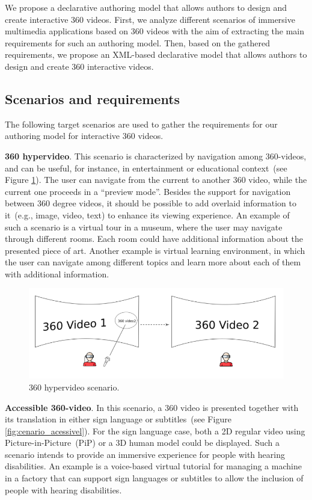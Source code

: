 We propose a declarative authoring model that allows authors to design and create interactive 360 videos.
First, we analyze different scenarios of immersive multimedia applications
based on 360 videos with the aim of extracting the main requirements for such
an authoring model.
Then, based on the gathered requirements, we propose an XML-based declarative
model that allows authors to design and create 360 interactive videos.

\subsection{Scenarios and requirements}
\label{subsec:authoring_scenarios}

The following target scenarios are used to gather the requirements for our
authoring model for interactive 360 videos.

\textbf{360 hypervideo}.
This scenario is characterized by navigation among 360-videos, and can be useful, for instance, in entertainment or educational context~(see Figure \ref{fig:cenario_hiper}).
The user can navigate from the current to another 360 video, while the current
one proceeds in a ``preview mode''.
Besides the support for navigation between 360 degree videos, it should be
possible to add overlaid information to it~(e.g., image, video, text) to
enhance its viewing experience.
An example of such a scenario is a virtual tour in a museum, where the user
may navigate through different rooms.
Each room could have additional information about the presented piece of art.
Another example is virtual learning environment, in which the user can navigate among different topics and learn more about each of them with additional information.

\begin{figure}[!ht]
    \centering
    \includegraphics[width=0.7\linewidth]{img/video360/hyper.png}
    \caption{360 hypervideo scenario.}
    \label{fig:cenario_hiper}
\end{figure}

\textbf{Accessible 360-video}. 
In this scenario, a 360 video is presented together with its translation in either sign language or subtitles~(see Figure \ref{fig:cenario_acessivel}).
For the sign language case, both a 2D regular video using Picture-in-Picture~(PiP) or a 3D human model could be displayed.
Such a scenario intends to provide an immersive experience for people with hearing disabilities.
An example is a voice-based virtual tutorial for managing a machine in a factory that can support sign languages or subtitles to allow the inclusion of people with hearing disabilities.

